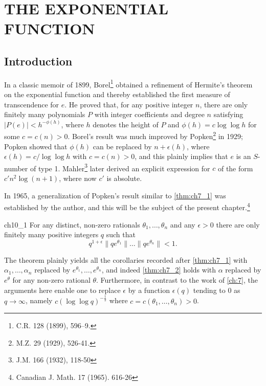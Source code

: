 
\chapter{THE EXPONENTIAL FUNCTION}\label{ch:10}

\section{Introduction}\label{sec:ch10_1}

In a classic memoir of 1899, Borel\footnote{C.R. 128 (1899), 596--9.} obtained a refinement of Hermite's theorem on the exponential function and thereby established the first measure of transcendence for $e$. He proved that, for any positive integer $n$, there are only finitely many polynomials $P$ with integer coefficients and degree $n$ satisfying $|P(e)| < h^{-\phi(h)}$, where $h$ denotes the height of $P$ and $\phi(h) = c \log \log h$ for some $c = c(n) > 0$. Borel's result was much improved by Popken\footnote{M.Z. 29 (1929), 526-41.} in 1929; Popken showed that $\phi(h)$ can be replaced by $n + \epsilon(h)$, where $\epsilon(h) = c/\log \log h$ with $c = c(n) > 0$, and this plainly implies that $e$ is an $S$-number of type 1. Mahler\footnote{J.M. 166 (1932), 118-50} later derived an explicit expression for $c$ of the form $c'n^2\log(n+1)$, where now $c'$ is absolute.

In 1965, a generalization of Popken's result similar to \autoref{thm:ch7_1} was established by the author, and this will be the subject of the present chapter.\footnote{Canadian J. Math. 17 (1965). 616-26}

\begin{mythm}{}{ch10_1}
For any distinct, non-zero rationals $\theta_1, \ldots, \theta_n$ and any $\epsilon > 0$ there are only finitely many positive integers $q$ such that
\[q^{1+\epsilon} \|q e^{\theta_1}\| \dots \|q e^{\theta_n}\| < 1.\]
\end{mythm}

The theorem plainly yields all the corollaries recorded after \autoref{thm:ch7_1} with $\alpha_1, \ldots, \alpha_n$ replaced by $e^{\theta_1}, \ldots, e^{\theta_n}$, and indeed \autoref{thm:ch7_2} holds with $\alpha$ replaced by $e^{\theta}$ for any non-zero rational $\theta$. Furthermore, in contrast to the work of \autoref{ch:7}, the arguments here enable one to replace $\epsilon$ by a function $\epsilon(q)$ tending to 0 as $q \to \infty$, namely $c(\log \log q)^{-\frac{1}{2}}$ where $c = c(\theta_1, \ldots, \theta_n) > 0$.

